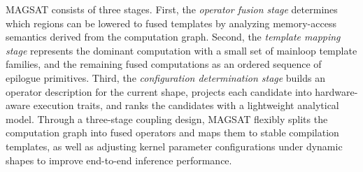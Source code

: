 MAGSAT consists of three stages.  First, the \textit{operator fusion stage} determines which 
regions can be lowered to fused templates by analyzing memory-access semantics derived 
from the computation graph. 
Second, the \textit{template mapping stage} represents the dominant computation with a small set of mainloop template
families, and the remaining fused computations as an ordered sequence of epilogue primitives.
Third, the \textit{configuration determination stage} builds an operator description for the current shape,
projects each candidate into hardware-aware execution traits, and ranks the
candidates with a lightweight analytical model.
Through a three-stage coupling design, MAGSAT flexibly splits the computation graph into fused operators and maps them to stable compilation templates, as well as adjusting kernel parameter configurations under dynamic shapes to improve end-to-end inference performance.





